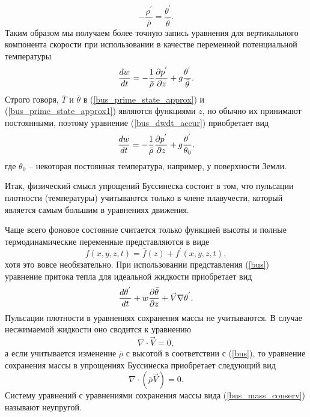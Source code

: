     \begin{equation}
    \label{bus_prime_state_approx1}
        -\frac{\rho^{'}}{\bar{\rho}} = \frac{\theta^{'}}{\bar{\theta}}.
    \end{equation}
    Таким образом мы получаем более точную запись уравнения для вертикального компонента скорости при использовании в качестве переменной потенциальной температуры
    \begin{equation}
    \label{bus_dwdt_accur}
        \displaystyle\frac{d w}{d t}=-\frac{1}{\bar{\rho}}\displaystyle\frac{\partial p^{'}}{\partial z}+g\frac{\theta^{'}}{\bar{\theta}}.
    \end{equation}
    Строго говоря, $\bar{T}$ и $\bar{\theta}$ в (\ref{bus_prime_state_approx}) и (\ref{bus_prime_state_approx1}) являются функциями $z$, но обычно их принимают постоянными, поэтому уравнение (\ref{bus_dwdt_accur}) приобретает вид
    \begin{equation}
    \label{bus_dwdt_accur1}
        \displaystyle\frac{d w}{d t}=-\frac{1}{\bar{\rho}}\displaystyle\frac{\partial p^{'}}{\partial z}+g\frac{\theta^{'}}{\theta_0}.
    \end{equation}
    где $\theta_0$ -- некоторая постоянная температура, например, у поверхности Земли. 

    Итак, физический смысл упрощений Буссинеска состоит в том, что пульсации плотности (температуры) учитываются только в члене плавучести, который является самым большим в уравнениях движения.

    Чаще всего фоновое состояние считается только функцией высоты и полные термодинамические переменные представляются в виде 
    \begin{equation}
    \label{bus}
        f(x,y,z,t) = \bar{f}(z) + f^{'}(x,y,z,t), 
    \end{equation}
    хотя это вовсе необязательно. При использовании представления (\ref{bus}) уравнение притока тепла для идеальной жидкости приобретает вид
    \begin{equation}
        \displaystyle\frac{d \theta^{'}}{d t} + w\displaystyle\frac{\partial \bar{\theta}}{\partial z} + \vec{V}\nabla\theta^{'}.
    \end{equation}
    Пульсации плотности в уравнениях сохранения массы не учитываются. В случае несжимаемой жидкости оно сводится к уравнению
    \[
    \nabla\cdot\vec{V}=0,
    \]
    а если учитывается изменение $\bar{\rho}$ с высотой в соответствии с (\ref{bus}), то уравнение сохранения массы в упрощениях Буссинеска приобретает следующий вид
    \begin{equation}
    \label{bus_mass_conserv}
        \nabla\cdot(\bar{\rho}\vec{V})=0.
    \end{equation}
    Систему уравнений с уравнениями сохранения массы вида (\ref{bus_mass_conserv}) называют неупругой. 

